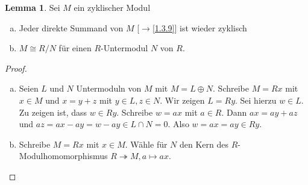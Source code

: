 \documentclass[
twoside=semi,
fontsize=12,
DIV=12, 
cleardoublepage=current,
leqno,
headings=optiontoheadandtoc, 
toc=idx
]{scrbook}
\theoremstyle{definition}
\newtheorem{lemma}[definition]{Lemma}
\begin{document}
	\begin{lemma}\label{1.5.3}\hfill\newline
		Sei $M$ ein zyklischer Modul
		\begin{enumerate}[(a)]
			\item Jeder direkte Summand von $M$ [$\rightarrow$\ref{1.3.9}] ist wieder zyklisch
			\item $M\cong R/N$ f\"ur einen $R$-Untermodul $N$ von $R$.
		\end{enumerate}
	
		\begin{proof}\hfill
			\begin{enumerate}[(a)]
				\item Seien $L$ und $N$ Untermoduln von $M$ mit $M = L \oplus N$. Schreibe $M=Rx$ mit $x \in M$ und $x = y+z$ mit $y\in L, z \in N$.
				Wir zeigen $L = Ry$. Sei hierzu $w \in L$. Zu zeigen ist, dass $w \in Ry$. Schreibe $w = ax$ mit $a \in R$. Dann $ax = ay + az$ und $az = ax - ay = w - ay \in L \cap N = 0$. Also $w = ax = ay \in Ry$. 
				
				\item Schreibe $M=Rx$ mit $x \in M$. W\"ahle f\"ur $N$ den Kern des $R$-Modulhomomorphismus $R\twoheadrightarrow M, a \mapsto ax$.
			\end{enumerate}
		\end{proof}
	\end{lemma}
\end{document}
